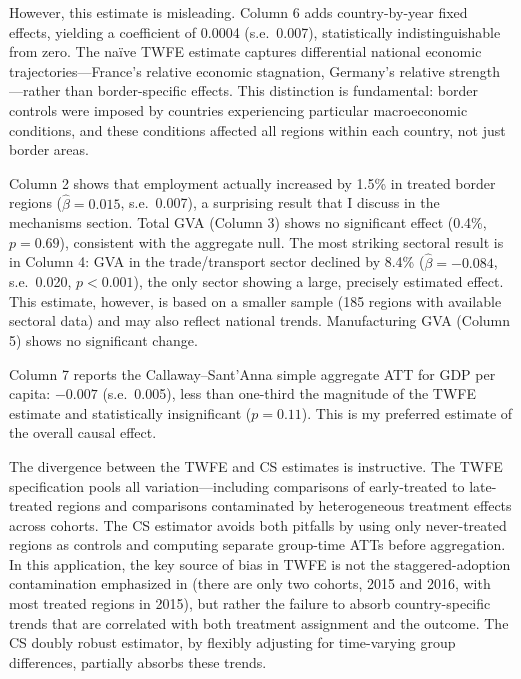 \documentclass[12pt]{article}
\begin{document}


However, this estimate is misleading. Column 6 adds country-by-year fixed effects, yielding a coefficient of 0.0004 (s.e.\ 0.007), statistically indistinguishable from zero. The na\"ive TWFE estimate captures differential national economic trajectories---France's relative economic stagnation, Germany's relative strength---rather than border-specific effects. This distinction is fundamental: border controls were imposed by countries experiencing particular macroeconomic conditions, and these conditions affected all regions within each country, not just border areas.

Column 2 shows that employment actually increased by 1.5\% in treated border regions ($\hat{\beta} = 0.015$, s.e.\ 0.007), a surprising result that I discuss in the mechanisms section. Total GVA (Column 3) shows no significant effect (0.4\%, $p = 0.69$), consistent with the aggregate null. The most striking sectoral result is in Column 4: GVA in the trade/transport sector declined by 8.4\% ($\hat{\beta} = -0.084$, s.e.\ 0.020, $p < 0.001$), the only sector showing a large, precisely estimated effect. This estimate, however, is based on a smaller sample (185 regions with available sectoral data) and may also reflect national trends. Manufacturing GVA (Column 5) shows no significant change.

Column 7 reports the Callaway--Sant'Anna simple aggregate ATT for GDP per capita: $-0.007$ (s.e.\ 0.005), less than one-third the magnitude of the TWFE estimate and statistically insignificant ($p = 0.11$). This is my preferred estimate of the overall causal effect.

The divergence between the TWFE and CS estimates is instructive. The TWFE specification pools all variation---including comparisons of early-treated to late-treated regions and comparisons contaminated by heterogeneous treatment effects across cohorts. The CS estimator avoids both pitfalls by using only never-treated regions as controls and computing separate group-time ATTs before aggregation. In this application, the key source of bias in TWFE is not the staggered-adoption contamination emphasized in \cite{GoodmanBacon2021} (there are only two cohorts, 2015 and 2016, with most treated regions in 2015), but rather the failure to absorb country-specific trends that are correlated with both treatment assignment and the outcome. The CS doubly robust estimator, by flexibly adjusting for time-varying group differences, partially absorbs these trends.
\end{document}
